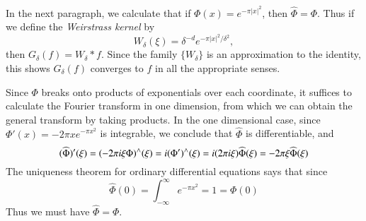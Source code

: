 \begin{example}
    In the next paragraph, we calculate that if $\Phi(x) = e^{-\pi |x|^2}$, then $\widehat{\Phi} = \Phi$. Thus if we define the \emph{Weirstrass kernel} by
    \[ W_\delta(\xi) = \delta^{-d} e^{-\pi |x|^2/\delta^2}, \]
    then $G_\delta(f) = W_\delta * f$. Since the family $\{ W_\delta \}$ is an approximation to the identity, this shows $G_\delta(f)$ converges to $f$ in all the appropriate senses.

    Since $\Phi$ breaks onto products of exponentials over each coordinate, it suffices to calculate the Fourier transform in one dimension, from which we can obtain the general transform by taking products. In the one dimensional case, since $\Phi'(x) = -2 \pi x e^{- \pi x^2}$ is integrable, we conclude that $\widehat{\Phi}$ is differentiable, and
    \[ (\widehat{\Phi})'(\xi) = (- 2 \pi i \xi \Phi)^\wedge(\xi) = i (\Phi')^\wedge(\xi) = i (2 \pi i \xi) \widehat{\Phi}(\xi) = - 2 \pi \xi \widehat{\Phi}(\xi) \]
    The uniqueness theorem for ordinary differential equations says that since
    \[ \widehat{\Phi}(0) = \int_{-\infty}^\infty e^{- \pi x^2} = 1 = \Phi(0) \]
    Thus we must have $\widehat{\Phi} = \Phi$.
\end{example}

